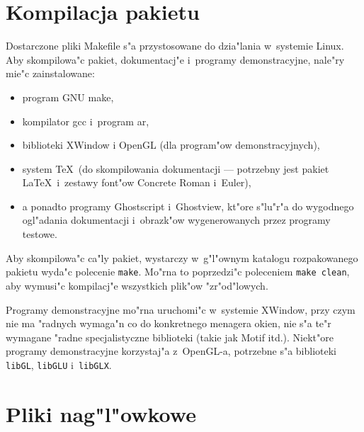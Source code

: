 \section{Kompilacja pakietu}

Dostarczone pliki Makefile s"a przystosowane do dzia"lania w~systemie Linux.
Aby skompilowa"c pakiet, dokumentacj"e i~programy demonstracyjne, nale"ry
mie"c zainstalowane:
\begin{itemize}
  \item program GNU make,
  \item kompilator gcc i~program ar,
  \item biblioteki XWindow i OpenGL (dla program"ow demonstracyjnych),
  \item system \TeX\ (do skompilowania dokumentacji --- potrzebny jest
    pakiet \LaTeX\ i~zestawy font"ow Concrete Roman i~Euler),
  \item a ponadto programy Ghostscript i~Ghostview, kt"ore s"lu"r"a do
    wygodnego ogl"adania dokumentacji i~obrazk"ow wygenerowanych przez
    programy testowe.
\end{itemize}
Aby skompilowa"c ca"ly pakiet, wystarczy w~g"l"ownym katalogu rozpakowanego
pakietu wyda"c polecenie \texttt{make}. Mo"rna to poprzedzi"c poleceniem
\texttt{make clean}, aby wymusi"c kompilacj"e wszystkich plik"ow
"zr"od"lowych.

Programy demonstracyjne mo"rna uruchomi"c w~systemie XWindow, przy czym nie
ma "radnych wymaga"n co do konkretnego menagera okien, nie s"a te"r wymagane
"radne specjalistyczne biblioteki (takie jak Motif itd.). Niekt"ore programy
demonstracyjne korzystaj"a z~OpenGL-a, potrzebne s"a biblioteki
\texttt{libGL}, \texttt{libGLU} i~\texttt{libGLX}.


\section{Pliki nag"l"owkowe}

